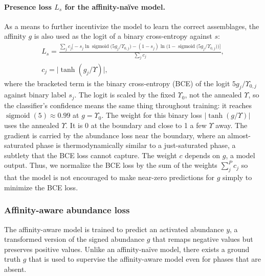 \paragraph{Presence loss $L_s$ for the affinity-na\"{i}ve model.} As a means to further incentivize the model to learn the correct assemblages, the affinity $g$ is also 
used as the logit of a binary cross-entropy against $s$:
\begin{equation}
  \begin{gathered}
    L_s = \frac{\sum_j c_j \Big[ -s_j \ln\operatorname{sigmoid}\!\big(5g_j/\Upsilon_{0,j}\big)
          - (1-s_j)\ln\Big(1-\operatorname{sigmoid}\!\big(5g_j/\Upsilon_{0,j}\big)\Big) \Big]}{\sum_j c_j},
    \\[4pt]
    c_j = \big|\tanh(g_j/\Upsilon)\big|,
  \end{gathered}
  \label{eq:sat}
\end{equation}
where the bracketed term is the binary cross-entropy (BCE) of the logit $5g_j/\Upsilon_{0,j}$ against binary label $s_j$.
The logit is scaled by the fixed $\Upsilon_0$, not the annealed $\Upsilon$, so the classifier's confidence means the same thing throughout training: it reaches
$\operatorname{sigmoid}(5) \approx 0.99$ at $g = \Upsilon_0$.
The weight for this binary loss $|\tanh(g/\Upsilon)|$ uses the annealed $\Upsilon$. It is 0 at the boundary and
close to 1 a few $\Upsilon$ away. The gradient is carried by the abundance loss near the boundary, where an almost-saturated phase
is thermodynamically similar to a just-saturated phase, a subtlety that the BCE loss cannot capture.
The weight $c$ depends on $g$, a model output. Thus, we normalize the BCE loss by the sum of the weights $\sum_j^P c_j$ so that the model 
is not encouraged to make near-zero predictions for $g$ simply to minimize the BCE loss.

\subsubsection{Affinity-aware abundance loss}\label{sec:affinity}
The affinity-aware model is trained to predict an activated abundance $y$, a transformed version of the signed abundance $g$ that remaps negative values 
but preserves positive values. Unlike an affinity-na\"{i}ve model, there exists a ground truth $g$ that is used to supervise the affinity-aware model even
for phases that are absent.   

